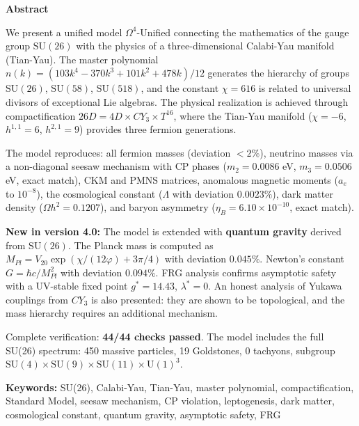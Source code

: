 \documentclass[12pt,a4paper,twoside]{article}
\newcommand{\SU}{\mathrm{SU}}
\newcommand{\Uone}{\mathrm{U}(1)}
\theoremstyle{definition}
\newenvironment{abstractbox}{%
  \begin{tcolorbox}[
    enhanced,
    colback=lightgray,
    colframe=deepblue,
    boxrule=0.8pt,
    arc=4pt,
    left=10pt, right=10pt, top=8pt, bottom=8pt,
    breakable
  ]
  \small
}{%
  \end{tcolorbox}
}
\begin{document}
\begin{abstractbox}
\begin{center}
{\Large\bfseries\color{deepblue} Abstract}
\end{center}
\vspace{0.3em}

We present a unified model $\Omega^4$-Unified connecting the mathematics of the gauge group $\SU(26)$ with the physics of a three-dimensional Calabi-Yau manifold (Tian-Yau). The master polynomial $n(k) = (103k^4 - 370k^3 + 101k^2 + 478k)/12$ generates the hierarchy of groups $\SU(26)$, $\SU(58)$, $\SU(518)$, and the constant $\chi = 616$ is related to universal divisors of exceptional Lie algebras. The physical realization is achieved through compactification $26D = 4D \times CY_3 \times T^{16}$, where the Tian-Yau manifold ($\chi = -6$, $h^{1,1} = 6$, $h^{2,1} = 9$) provides three fermion generations.

The model reproduces: all fermion masses (deviation $< 2\%$), neutrino masses via a non-diagonal seesaw mechanism with CP phases ($m_2 = 0.0086$ eV, $m_3 = 0.0506$ eV, exact match), CKM and PMNS matrices, anomalous magnetic moments ($a_e$ to $10^{-8}$), the cosmological constant ($\Lambda$ with deviation $0.0023\%$), dark matter density ($\Omega h^2 = 0.1207$), and baryon asymmetry ($\eta_B = 6.10 \times 10^{-10}$, exact match).

\textbf{New in version 4.0:} The model is extended with \textbf{quantum gravity} derived from $\SU(26)$. The Planck mass is computed as $M_{Pl} = V_{20} \exp(\chi/(12\varphi) + 3\pi/4)$ with deviation $0.045\%$. Newton's constant $G = \hbar c / M_{Pl}^2$ with deviation $0.094\%$. FRG analysis confirms asymptotic safety with a UV-stable fixed point $g^* = 14.43$, $\lambda^* = 0$. An honest analysis of Yukawa couplings from $CY_3$ is also presented: they are shown to be topological, and the mass hierarchy requires an additional mechanism.

Complete verification: \textbf{44/44 checks passed}. The model includes the full SU(26) spectrum: 450 massive particles, 19 Goldstones, 0 tachyons, subgroup $\SU(4) \times \SU(9) \times \SU(11) \times \Uone^3$.

\vspace{0.3em}
\textbf{Keywords:} SU(26), Calabi-Yau, Tian-Yau, master polynomial, compactification, Standard Model, seesaw mechanism, CP violation, leptogenesis, dark matter, cosmological constant, quantum gravity, asymptotic safety, FRG
\end{abstractbox}
\end{document}
